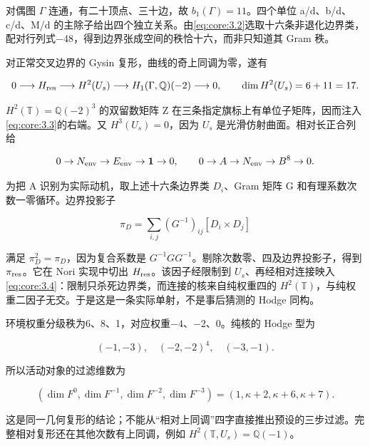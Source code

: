 \documentclass[11pt,a4paper,oneside]{ctexart}
\theoremstyle{cnplain}
\theoremstyle{definition}
\theoremstyle{remark}
\numberwithin{equation}{section}
\begin{document}
对偶图 \(\Gamma \) 连通，有二十顶点、三十边，故 \(b_1(\Gamma)=11\)。四个单位 a/d、b/d、c/d、M/d 的主除子给出四个独立关系。由\eqref{eq:core:3.2}选取十六条非退化边界类，配对行列式\(- 48\)，得到边界张成空间的秩恰十六，而非只知道其 Gram 秩。

对正常交叉边界的 Gysin 复形，曲线的奇上同调为零，遂有

\begin{equation}
0\longrightarrow H_{\rm res}\longrightarrow H^2(U_s)
 \longrightarrow H_1(\Gamma,\mathbb Q)(-2)\longrightarrow0,
 \qquad \dim H^2(U_s)=6+11=17.                          \label{eq:core:3.3}
\end{equation}

\(H^2(\mathbb T)=\mathbb Q(-2)^3\) 的双留数矩阵 Z 在三条指定旗标上有单位子矩阵，因而注入\eqref{eq:core:3.3}的右端。又 \(H^3(U_s)=0\)，因为 \(U_s\) 是光滑仿射曲面。相对长正合列给

\begin{equation}
0\to N_{\rm env}\to E_{\rm env}\to\mathbf1\to0,
 \qquad 0\to A\to N_{\rm env}\to B^8\to0.              \label{eq:core:3.4}
\end{equation}

为把 A 识别为实际动机，取上述十六条边界类 \(D_i\)、Gram 矩阵 G 和有理系数次数一零循环。边界投影子

\begin{equation}
\pi_D=\sum_{i,j}(G^{-1})_{ij}[D_i\times D_j]
\end{equation}

满足 \(\pi_D^2=\pi_D\)，因为复合系数是 \(G^{-1}GG^{-1}\)。剔除次数零、四及边界投影子，得到 \(\pi_{\rm res}\)。它在 Nori 实现中切出 \(H_{\rm res}\)。该因子经限制到 \(U_s\)、再经相对连接映入\eqref{eq:core:3.4}：限制只杀死边界类，而连接的核来自纯权重四的 \(H^2(\mathbb T)\)，与纯权重二因子无交。于是这是一条实际单射，不是事后猜测的 Hodge 同构。

环境权重分级秩为6、8、1，对应权重\(- 4\)、\(- 2\)、0。纯核的 Hodge 型为

\begin{equation}
(-1,-3),\quad(-2,-2)^4,\quad(-3,-1).
\end{equation}

所以活动对象的过滤维数为

\begin{equation}
(\dim F^0,\dim F^{-1},\dim F^{-2},\dim F^{-3})
                  =(1,\kappa+2,\kappa+6,\kappa+7).       \label{eq:core:3.5}
\end{equation}

这是同一几何复形的结论；不能从``相对上同调''四字直接推出预设的三步过滤。完整相对复形还在其他次数有上同调，例如 \(H^2(\mathbb T,U_s)=\mathbb Q(-1)\)。
\end{document}
